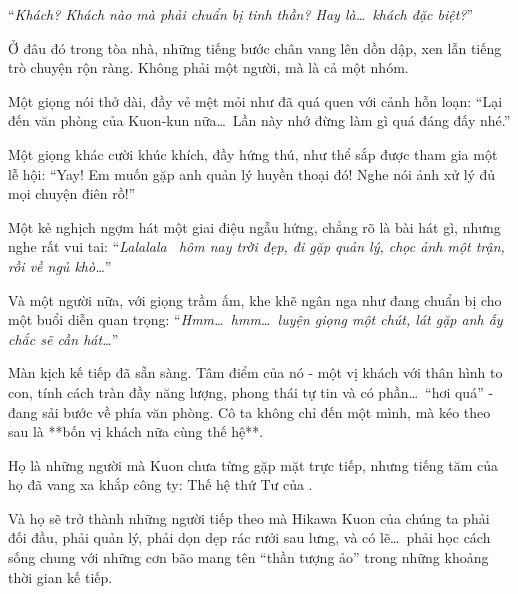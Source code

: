 \documentclass[../main.tex]{subfiles}
\begin{document}
``\textit{Khách? Khách nào mà phải chuẩn bị tinh thần? Hay là\dots\ khách đặc biệt?}''

\il

Ở đâu đó trong tòa nhà, những tiếng bước chân vang lên dồn dập, xen lẫn tiếng trò chuyện rộn ràng. Không phải một người, mà là cả một nhóm.

Một giọng nói thở dài, đầy vẻ mệt mỏi như đã quá quen với cảnh hỗn loạn: ``Lại đến văn phòng của Kuon-kun nữa\dots\ Lần này nhớ đừng làm gì quá đáng đấy nhé.''

Một giọng khác cười khúc khích, đầy hứng thú, như thể sắp được tham gia một lễ hội: ``Yay! Em muốn gặp anh quản lý huyền thoại đó! Nghe nói ảnh xử lý đủ mọi chuyện điên rồ!''

Một kẻ nghịch ngợm hát một giai điệu ngẫu hứng, chẳng rõ là bài hát gì, nhưng nghe rất vui tai: ``\textit{Lalalala~ hôm nay trời đẹp, đi gặp quản lý, chọc ảnh một trận, rồi về ngủ khò\dots}''

Và một người nữa, với giọng trầm ấm, khe khẽ ngân nga như đang chuẩn bị cho một buổi diễn quan trọng: ``\textit{Hmm\dots\ hmm\dots\ luyện giọng một chút, lát gặp anh ấy chắc sẽ cần hát\dots}''

Màn kịch kế tiếp đã sẵn sàng. Tâm điểm của nó - một vị khách với thân hình to con, tính cách tràn đầy năng lượng, phong thái tự tin và có phần\dots\ ``hơi quá'' - đang sải bước về phía văn phòng. Cô ta không chỉ đến một mình, mà kéo theo sau là **bốn vị khách nữa cùng thế hệ**.

Họ là những người mà Kuon chưa từng gặp mặt trực tiếp, nhưng tiếng tăm của họ đã vang xa khắp công ty: Thế hệ thứ Tư của \hll.

Và họ sẽ trở thành những người tiếp theo mà Hikawa Kuon của chúng ta phải đối đầu, phải quản lý, phải dọn dẹp rác rưởi sau lưng, và có lẽ\dots\ phải học cách sống chung với những cơn bão mang tên ``thần tượng ảo'' trong những khoảng thời gian kế tiếp.
\end{document}
